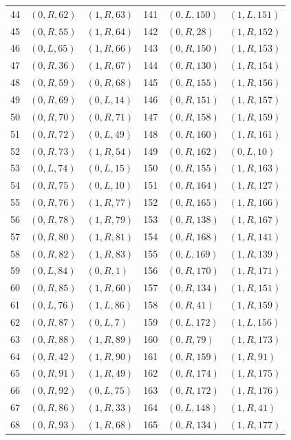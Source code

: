 \begin{longtable}{r@{\quad}ll@{\qquad}r@{\quad}ll}
44 & $(0,R,62)$ & $(1,R,63)$ & 141 & $(0,L,150)$ & $(1,L,151)$\\
45 & $(0,R,55)$ & $(1,R,64)$ & 142 & $(0,R,28)$ & $(1,R,152)$\\
46 & $(0,L,65)$ & $(1,R,66)$ & 143 & $(0,R,150)$ & $(1,R,153)$\\
47 & $(0,R,36)$ & $(1,R,67)$ & 144 & $(0,R,130)$ & $(1,R,154)$\\
48 & $(0,R,59)$ & $(0,R,68)$ & 145 & $(0,R,155)$ & $(1,R,156)$\\
49 & $(0,R,69)$ & $(0,L,14)$ & 146 & $(0,R,151)$ & $(1,R,157)$\\
50 & $(0,R,70)$ & $(0,R,71)$ & 147 & $(0,R,158)$ & $(1,R,159)$\\
51 & $(0,R,72)$ & $(0,L,49)$ & 148 & $(0,R,160)$ & $(1,R,161)$\\
52 & $(0,R,73)$ & $(1,R,54)$ & 149 & $(0,R,162)$ & $(0,L,10)$\\
53 & $(0,L,74)$ & $(0,L,15)$ & 150 & $(0,R,155)$ & $(1,R,163)$\\
54 & $(0,R,75)$ & $(0,L,10)$ & 151 & $(0,R,164)$ & $(1,R,127)$\\
55 & $(0,R,76)$ & $(1,R,77)$ & 152 & $(0,R,165)$ & $(1,R,166)$\\
56 & $(0,R,78)$ & $(1,R,79)$ & 153 & $(0,R,138)$ & $(1,R,167)$\\
57 & $(0,R,80)$ & $(1,R,81)$ & 154 & $(0,R,168)$ & $(1,R,141)$\\
58 & $(0,R,82)$ & $(1,R,83)$ & 155 & $(0,L,169)$ & $(1,R,139)$\\
59 & $(0,L,84)$ & $(0,R,1)$ & 156 & $(0,R,170)$ & $(1,R,171)$\\
60 & $(0,R,85)$ & $(1,R,60)$ & 157 & $(0,R,134)$ & $(1,R,151)$\\
61 & $(0,L,76)$ & $(1,L,86)$ & 158 & $(0,R,41)$ & $(1,R,159)$\\
62 & $(0,R,87)$ & $(0,L,7)$ & 159 & $(0,L,172)$ & $(1,L,156)$\\
63 & $(0,R,88)$ & $(1,R,89)$ & 160 & $(0,R,79)$ & $(1,R,173)$\\
64 & $(0,R,42)$ & $(1,R,90)$ & 161 & $(0,R,159)$ & $(1,R,91)$\\
65 & $(0,R,91)$ & $(1,R,49)$ & 162 & $(0,R,174)$ & $(1,R,175)$\\
66 & $(0,R,92)$ & $(0,L,75)$ & 163 & $(0,R,172)$ & $(1,R,176)$\\
67 & $(0,R,86)$ & $(1,R,33)$ & 164 & $(0,L,148)$ & $(1,R,41)$\\
68 & $(0,R,93)$ & $(1,R,68)$ & 165 & $(0,R,134)$ & $(1,R,177)$\\

\end{longtable}
